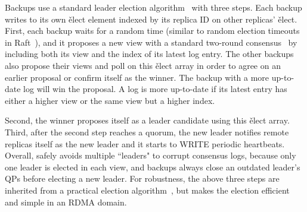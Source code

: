 Backups use a standard \paxos leader election algorithm~\cite{paxos:practical} 
with three steps. Each backup writes to its own \v{elect} element indexed by 
its replica ID on other replicas' \v{elect}. First, each backup waits for a 
random time (similar to random election timeouts in Raft~\cite{raft:usenix14}), 
and it proposes a new view with a standard two-round 
\paxos consensus~\cite{paxos:simple} by including both its view and the index 
of its latest log entry. The other backups also propose their views and poll on 
this \v{elect} array in order to agree on an earlier proposal or confirm itself 
as the winner. The backup with a more up-to-date log will win the proposal. A 
log is more up-to-date if its latest entry has either a higher view or the same 
view but a higher index.

Second, the winner proposes itself as a leader candidate using this \v{elect}
array. Third, after the second step reaches a quorum, the new leader notifies 
remote replicas itself as the new leader and it starts to WRITE periodic 
heartbeats. Overall, \xxx safely avoids multiple ``leaders" to corrupt 
consensus logs, because only one leader is elected in each view, and backups 
always close an outdated leader's QPs before electing a new leader. For 
robustness, the above three steps are inherited from a practical \paxos 
election algorithm~\cite{paxos:practical}, but \xxx makes the election 
efficient and simple in an RDMA domain.